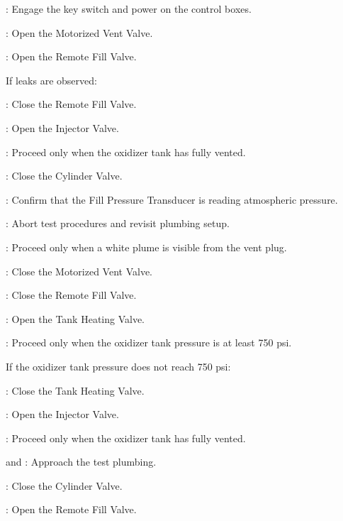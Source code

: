 \begin{checklist}
    \item \control{}: Engage the key switch and power on the control boxes.
    \item \control{}: Open the Motorized Vent Valve.
    \item \control{}: Open the Remote Fill Valve.
    \begin{checklist}[label=$\bullet$]
        \item If leaks are observed:
        \begin{checklist}
            \item \control{}: Close the Remote Fill Valve.
            \item \control{}: Open the Injector Valve.
            \item \ops: Proceed only when the oxidizer tank has fully vented.
            \item \primary{}: Close the Cylinder Valve.
            \item \daq{}: Confirm that the Fill Pressure Transducer is reading atmospheric pressure.
            \item \ops{}: Abort test procedures and revisit plumbing setup.
        \end{checklist}
    \end{checklist}
    \item \ops{}: Proceed only when a white plume is visible from the vent plug.
    \item \control{}: Close the Motorized Vent Valve.
    \item \control{}: Close the Remote Fill Valve.
    \item \heat: Open the Tank Heating Valve.
    \item \daq{}: Proceed only when the oxidizer tank pressure is at least 750 psi.
    \begin{checklist}[label=$\bullet$]
        \item If the oxidizer tank pressure does not reach 750 psi:
        \begin{checklist}
            \item \heat: Close the Tank Heating Valve.
            \item \control{}: Open the Injector Valve.
            \item \ops: Proceed only when the oxidizer tank has fully vented.
            \item \primary{} and \secondary: Approach the test plumbing.
            \item \primary{}: Close the Cylinder Valve.
            \item \control{}: Open the Remote Fill Valve.

\end{checklist}
\end{checklist}
\end{checklist}
